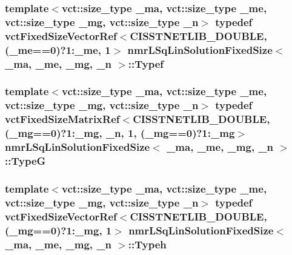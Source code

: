 \hypertarget{classnmr_l_sq_lin_solution_fixed_size_ada2bec63c68d10997259c4c0fff5a085}{
\subsubsection[{Typef}]{\setlength{\rightskip}{0pt plus 5cm}template$<$vct\-::size\-\_\-type \-\_\-ma, vct\-::size\-\_\-type \-\_\-me, vct\-::size\-\_\-type \-\_\-mg, vct\-::size\-\_\-type \-\_\-n$>$ typedef {\bf vct\-Fixed\-Size\-Vector\-Ref}$<$C\-I\-S\-S\-T\-N\-E\-T\-L\-I\-B\-\_\-\-D\-O\-U\-B\-L\-E, (\-\_\-me==0)?1\-:\-\_\-me, 1$>$ {\bf nmr\-L\-Sq\-Lin\-Solution\-Fixed\-Size}$<$ \-\_\-ma, \-\_\-me, \-\_\-mg, \-\_\-n $>$\-::{\bf Typef}}}\label{classnmr_l_sq_lin_solution_fixed_size_ada2bec63c68d10997259c4c0fff5a085}
\hypertarget{classnmr_l_sq_lin_solution_fixed_size_a043640ee3f0a5a11b4b6972ddd9c8b90}{
\subsubsection[{Type\-G}]{\setlength{\rightskip}{0pt plus 5cm}template$<$vct\-::size\-\_\-type \-\_\-ma, vct\-::size\-\_\-type \-\_\-me, vct\-::size\-\_\-type \-\_\-mg, vct\-::size\-\_\-type \-\_\-n$>$ typedef {\bf vct\-Fixed\-Size\-Matrix\-Ref}$<$C\-I\-S\-S\-T\-N\-E\-T\-L\-I\-B\-\_\-\-D\-O\-U\-B\-L\-E, (\-\_\-mg==0)?1\-:\-\_\-mg, \-\_\-n, 1, (\-\_\-mg==0)?1\-:\-\_\-mg$>$ {\bf nmr\-L\-Sq\-Lin\-Solution\-Fixed\-Size}$<$ \-\_\-ma, \-\_\-me, \-\_\-mg, \-\_\-n $>$\-::{\bf Type\-G}}}\label{classnmr_l_sq_lin_solution_fixed_size_a043640ee3f0a5a11b4b6972ddd9c8b90}
\hypertarget{classnmr_l_sq_lin_solution_fixed_size_aa86f02bad0142d8bccac845d426bb153}{
\subsubsection[{Typeh}]{\setlength{\rightskip}{0pt plus 5cm}template$<$vct\-::size\-\_\-type \-\_\-ma, vct\-::size\-\_\-type \-\_\-me, vct\-::size\-\_\-type \-\_\-mg, vct\-::size\-\_\-type \-\_\-n$>$ typedef {\bf vct\-Fixed\-Size\-Vector\-Ref}$<$C\-I\-S\-S\-T\-N\-E\-T\-L\-I\-B\-\_\-\-D\-O\-U\-B\-L\-E, (\-\_\-mg==0)?1\-:\-\_\-mg, 1$>$ {\bf nmr\-L\-Sq\-Lin\-Solution\-Fixed\-Size}$<$ \-\_\-ma, \-\_\-me, \-\_\-mg, \-\_\-n $>$\-::{\bf Typeh}}}\label{classnmr_l_sq_lin_solution_fixed_size_aa86f02bad0142d8bccac845d426bb153}
